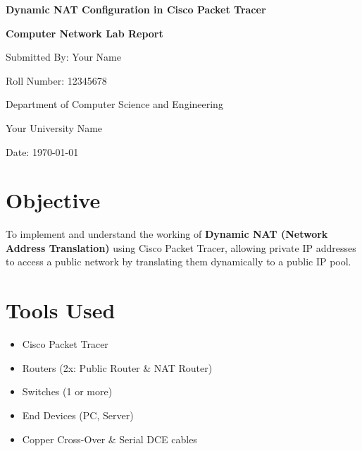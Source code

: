 \documentclass[12pt]{article}
\begin{document}
\begin{titlepage}
    \centering
    \vspace*{2cm}
    
    {\Huge \bfseries Dynamic NAT Configuration in Cisco Packet Tracer\par}
    \vspace{2cm}
    
    {\Large \textbf{Computer Network Lab Report}\par}
    \vspace{1.5cm}
    
    {\large Submitted By: Your Name\par}
    \vspace{0.5cm}
    {\large Roll Number: 12345678\par}
    \vspace{0.5cm}
    {\large Department of Computer Science and Engineering\par}
    \vspace{0.5cm}
    {\large Your University Name\par}
    
    \vfill
    
    {\large Date: \today\par}
\end{titlepage}


\section*{Objective}
To implement and understand the working of \textbf{Dynamic NAT (Network Address Translation)} using Cisco Packet Tracer, allowing private IP addresses to access a public network by translating them dynamically to a public IP pool.

\section*{Tools Used}
\begin{itemize}
  \item Cisco Packet Tracer
  \item Routers (2x: Public Router \& NAT Router)
  \item Switches (1 or more)
  \item End Devices (PC, Server)
  \item Copper Cross-Over \& Serial DCE cables
\end{itemize}
\end{document}
